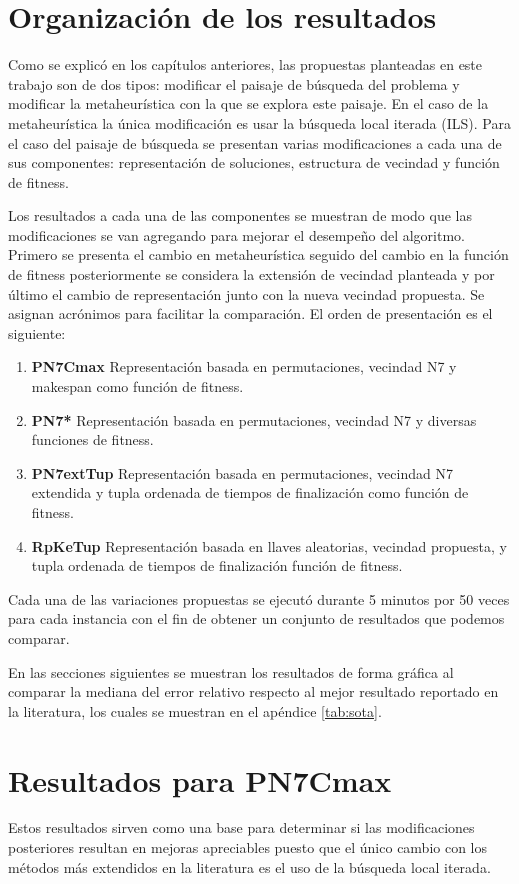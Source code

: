 \section{Organización de los resultados}
Como se explicó en los capítulos anteriores, las propuestas planteadas en este trabajo son de dos tipos: modificar el paisaje de búsqueda del problema y modificar la metaheurística con la que se explora este paisaje.
En el caso de la metaheurística la única modificación es usar la búsqueda local iterada (ILS). Para el caso del paisaje de búsqueda se presentan varias modificaciones a cada una de sus componentes: representación de soluciones, estructura de vecindad y función de fitness.

Los resultados a cada una de las componentes se muestran de modo que las modificaciones se van agregando para mejorar el desempeño del algoritmo. Primero se presenta el cambio en metaheurística seguido del cambio en la función de fitness posteriormente se considera la extensión de vecindad planteada y por último el cambio de representación junto con la nueva vecindad propuesta. Se asignan acrónimos para facilitar la comparación. El orden de presentación es el siguiente:
\begin{enumerate}
    \item \textbf{PN7Cmax} Representación basada en permutaciones, vecindad N7 y makespan como función de fitness.
    \item \textbf{PN7*} Representación basada en permutaciones, vecindad N7 y diversas funciones de fitness.
    \item \textbf{PN7extTup} Representación basada en permutaciones, vecindad N7 extendida y tupla ordenada de tiempos de finalización como función de fitness.
    \item \textbf{RpKeTup} Representación basada en llaves aleatorias, vecindad propuesta, y tupla ordenada de tiempos de finalización función de fitness.
\end{enumerate}

Cada una de las variaciones propuestas se ejecutó durante 5 minutos por 50 veces para cada instancia con el fin de obtener un conjunto de resultados que podemos comparar.

En las secciones siguientes se muestran los resultados de forma gráfica al comparar la mediana del error relativo respecto al mejor resultado reportado en la literatura, los cuales se muestran en el apéndice \ref{tab:sota}.
\section{Resultados para PN7Cmax}
Estos resultados sirven como una base para determinar si las modificaciones posteriores resultan en mejoras apreciables puesto que el único cambio con los métodos más extendidos en la literatura es el uso de la búsqueda local iterada.

